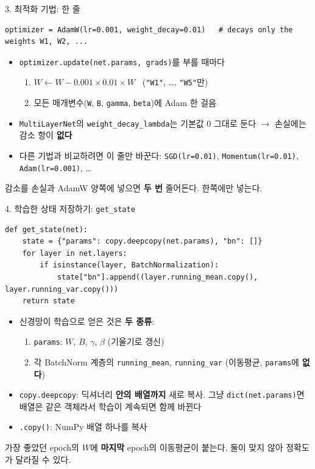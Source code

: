 \documentclass[aspectratio=169,11pt]{beamer}
\newcommand{\code}[1]{\texttt{#1}}
\begin{document}
\begin{frame}[fragile]{3. 최적화 기법: 한 줄}
\begin{lstlisting}
optimizer = AdamW(lr=0.001, weight_decay=0.01)   # decays only the weights W1, W2, ...
\end{lstlisting}
\begin{itemize}
\item \code{optimizer.update(net.params, grads)}를 부를 때마다
\begin{enumerate}
\item $W \leftarrow W - 0.001\times0.01\times W$ \ (\code{"W1"}, \ldots, \code{"W5"}만)
\item 모든 매개변수(\code{W}, \code{B}, \code{gamma}, \code{beta})에 Adam 한 걸음
\end{enumerate}
\item \code{MultiLayerNet}의 \code{weight\_decay\_lambda}는 기본값 $0$ 그대로 둔다 $\to$ 손실에는 감소 항이 \textbf{없다}
\item 다른 기법과 비교하려면 이 줄만 바꾼다: \code{SGD(lr=0.01)}, \code{Momentum(lr=0.01)}, \code{Adam(lr=0.001)}, \ldots
\end{itemize}
\begin{remarkbox}
\small 감소를 손실과 AdamW 양쪽에 넣으면 \textbf{두 번} 줄어든다. 한쪽에만 넣는다.
\end{remarkbox}
\end{frame}

\begin{frame}{4. 학습한 상태 저장하기: \code{get\_state}}
\small
\begin{lstlisting}
def get_state(net):
    state = {"params": copy.deepcopy(net.params), "bn": []}
    for layer in net.layers:
        if isinstance(layer, BatchNormalization):
            state["bn"].append((layer.running_mean.copy(), layer.running_var.copy()))
    return state
\end{lstlisting}
\begin{itemize}
\item 신경망이 학습으로 얻은 것은 \textbf{두 종류}:
\begin{enumerate}
\item \code{params}: $W$, $B$, $\gamma$, $\beta$ (기울기로 갱신)
\item 각 BatchNorm 계층의 \code{running\_mean}, \code{running\_var} (이동평균, \code{params}에 \textbf{없다})
\end{enumerate}
\item \code{copy.deepcopy}: 딕셔너리 \textbf{안의 배열까지} 새로 복사. 그냥 \code{dict(net.params)}면 배열은 같은 객체라서 학습이 계속되면 함께 바뀐다
\item \code{.copy()}: NumPy 배열 하나를 복사
\end{itemize}
\begin{thinkbox}
\small 가장 좋았던 epoch의 $W$에 \textbf{마지막} epoch의 이동평균이 붙는다. 둘이 맞지 않아 정확도가 달라질 수 있다.
\end{thinkbox}
\end{frame}
\end{document}
